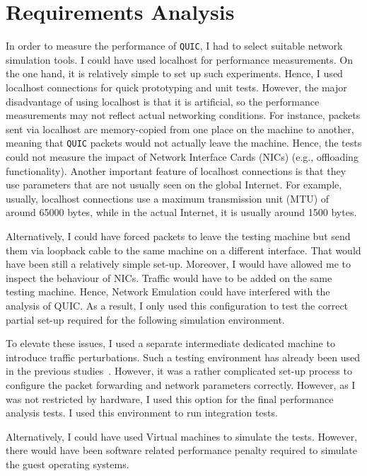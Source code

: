 \documentclass[12pt,a4paper,twoside,openright]{report}
\begin{document}
\section{Requirements Analysis}

In order to measure the performance of \texttt{QUIC}, I had to select suitable network simulation tools.
I could have used localhost for performance measurements.
On the one hand, it is relatively simple to set up such experiments.
Hence, I used localhost connections for quick prototyping and unit tests.
However, the major disadvantage of using localhost is that it is artificial, so the performance measurements may not reflect actual networking conditions.
For instance, packets sent via localhost are memory-copied from one place on the machine to another, meaning that \texttt{QUIC} packets would not actually leave the machine.
Hence, the tests could not measure the impact of Network Interface Cards (NICs) (e.g., offloading functionality).
Another important feature of localhost connections is that they use parameters that are not usually seen on the global Internet.
For example, usually, localhost connections use a maximum transmission unit (MTU) of around 65000 bytes, while in the actual Internet, it is usually around 1500 bytes.

 Alternatively, I could have forced packets to leave the testing machine but send them via loopback cable to the same machine on a different interface. 
 That would have been still a relatively simple set-up. 
 Moreover, I would have allowed me to inspect the behaviour of NICs.
 Traffic would have to be added on the same testing machine.
 Hence, Network Emulation could have interfered with the analysis of QUIC.
 As a result, I only used this configuration to test the correct partial set-up required for the following simulation environment.
 
 To elevate these issues, I used a separate intermediate dedicated machine to introduce traffic perturbations.
 Such a testing environment has already been used in the previous studies~\cite{Making_QUIC_Quicker}.
 However, it was a rather complicated set-up process to configure the packet forwarding and network parameters correctly.
 However, as I was not restricted by hardware, I used this option for the final performance analysis tests.
 I used this environment to run integration tests.
 
 Alternatively, I could have used Virtual machines to simulate the tests.
 However, there would have been software related performance penalty required to simulate the guest operating systems.
 
\end{document}
